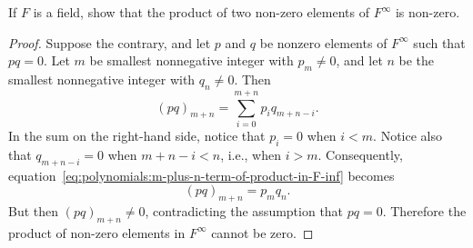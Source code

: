  If $F$ is a field, show that the product of two non-zero
elements of $F^\infty$ is non-zero.
\begin{proof}
  Suppose the contrary, and let $p$ and $q$ be nonzero elements of
  $F^\infty$ such that $pq = 0$. Let $m$ be smallest nonnegative
  integer with $p_m\neq0$, and let $n$ be the smallest nonnegative
  integer with $q_n\neq0$. Then
  \begin{equation}
    \label{eq:polynomials:m-plus-n-term-of-product-in-F-inf}
    (pq)_{m+n}
    = \sum_{i=0}^{m+n}p_iq_{m+n-i}.
  \end{equation}
  In the sum on the right-hand side, notice that $p_i = 0$ when
  $i < m$. Notice also that $q_{m+n-i} = 0$ when $m+n-i < n$, i.e.,
  when $i > m$. Consequently,
  equation~\eqref{eq:polynomials:m-plus-n-term-of-product-in-F-inf}
  becomes
  \begin{equation*}
    (pq)_{m+n} = p_mq_n.
  \end{equation*}
  But then $(pq)_{m+n}\neq0$, contradicting the assumption that
  $pq = 0$. Therefore the product of non-zero elements in $F^\infty$
  cannot be zero.
\end{proof}

